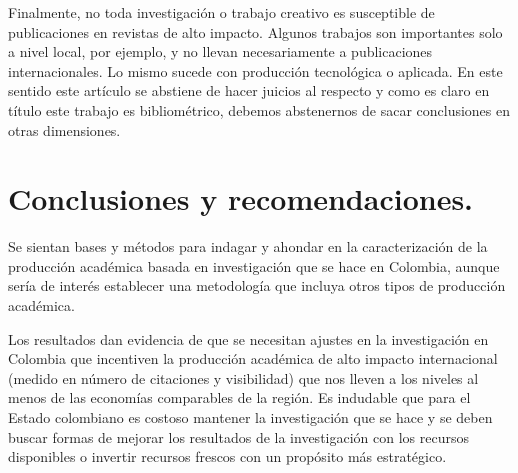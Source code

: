 \documentclass[
11pt, %
letter, %
oneside, %
]{article} %
\begin{document}
Finalmente, no toda investigación o trabajo creativo es susceptible de publicaciones en revistas de alto impacto. Algunos trabajos son importantes solo a nivel local, por ejemplo, y no llevan necesariamente a publicaciones internacionales. Lo mismo sucede con producción tecnológica o aplicada. En este sentido este artículo se abstiene de hacer juicios al respecto y como es claro en título este trabajo es bibliométrico, debemos abstenernos de sacar conclusiones en otras dimensiones. 

\section{Conclusiones y recomendaciones.}

Se sientan bases y métodos para indagar y ahondar en la caracterización de la producción académica basada en investigación que se hace en Colombia, aunque sería de interés establecer una metodología que incluya otros tipos de producción académica. 

Los resultados dan evidencia de que se necesitan ajustes en la investigación en Colombia que incentiven la producción académica de alto impacto internacional (medido en número de citaciones y visibilidad) que nos lleven a los niveles al menos de las economías comparables de la región. Es indudable que para el Estado colombiano es costoso mantener la investigación que se hace y se deben buscar formas de mejorar los resultados de la investigación con los recursos disponibles o invertir recursos frescos con un propósito más estratégico.
\end{document}

